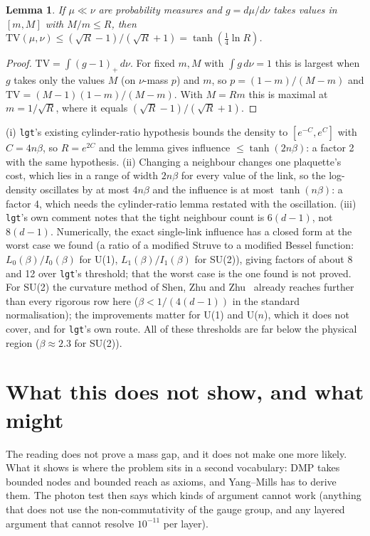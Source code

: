 \documentclass[11pt,a4paper]{article}
\newtheorem*{lemma}{Lemma}
\begin{document}
\begin{lemma}
If $\mu\ll\nu$ are probability measures and $g=d\mu/d\nu$ takes values in $[m,M]$ with $M/m\le R$, then
$\mathrm{TV}(\mu,\nu)\le(\sqrt R-1)/(\sqrt R+1)=\tanh(\tfrac14\ln R)$.
\end{lemma}
\begin{proof}
$\mathrm{TV}=\int(g-1)_+\,d\nu$. For fixed $m,M$ with $\int g\,d\nu=1$ this is largest when $g$ takes only the values $M$ (on $\nu$-mass $p$) and
$m$, so $p=(1-m)/(M-m)$ and $\mathrm{TV}=(M-1)(1-m)/(M-m)$. With $M=Rm$ this is maximal at $m=1/\sqrt R$, where it equals
$(\sqrt R-1)/(\sqrt R+1)$.
\end{proof}

(i) \texttt{lgt}'s existing cylinder-ratio hypothesis bounds the density to $[e^{-C},e^{C}]$ with $C=4n\beta$, so $R=e^{2C}$ and the lemma gives
influence $\le\tanh(2n\beta)$: a factor 2 with the same hypothesis. (ii) Changing a neighbour changes one plaquette's cost, which lies in a
range of width $2n\beta$ for every value of the link, so the log-density oscillates by at most $4n\beta$ and the influence is at most
$\tanh(n\beta)$: a factor 4, which needs the cylinder-ratio lemma restated with the oscillation. (iii) \texttt{lgt}'s own comment notes that the
tight neighbour count is $6(d-1)$, not $8(d-1)$. Numerically, the exact single-link influence has a closed form at the worst case we found
(a ratio of a modified Struve to a modified Bessel function: $L_0(\beta)/I_0(\beta)$ for U(1), $L_1(\beta)/I_1(\beta)$ for SU(2)), giving
factors of about 8 and 12 over \texttt{lgt}'s threshold; that the worst case is the one found is not proved. For SU(2) the curvature method of
Shen, Zhu and Zhu~\cite{szz} already reaches further than every rigorous row here ($\beta<1/(4(d-1))$ in the standard normalisation); the
improvements matter for U(1) and U($n$), which it does not cover, and for \texttt{lgt}'s own route. All of these thresholds are far below the
physical region ($\beta\approx2.3$ for SU(2)).

\section{What this does not show, and what might}\label{sec:outlook}

The reading does not prove a mass gap, and it does not make one more likely. What it shows is where the problem sits in a second vocabulary:
DMP takes bounded nodes and bounded reach as axioms, and Yang--Mills has to derive them. The photon test then says which kinds of argument
cannot work (anything that does not use the non-commutativity of the gauge group, and any layered argument that cannot resolve
$10^{-11}$ per layer).
\end{document}
